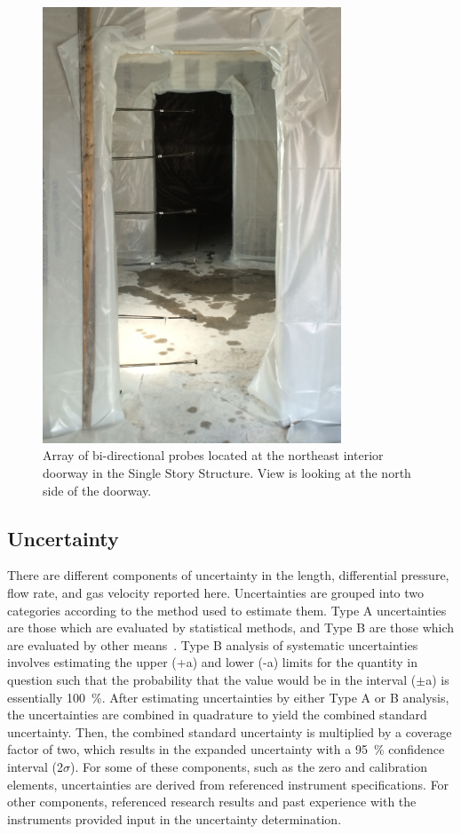 \documentclass[12pt,oneside]{book}
\begin{document}
\begin{figure}[!ht]
	\includegraphics[width=3.5in]{../Figures/Pictures/BDPs_east}
	\caption[Array of bi-directional probes at interior doorway in Single Story Structure.]{Array of bi-directional probes located at the northeast interior doorway in the Single Story Structure. View is looking at the north side of the doorway.}
	\label{fig:BDPs}
\end{figure}
\FloatBarrier

\subsection{Uncertainty}
\label{sec:uncertainty}
There are different components of uncertainty in the length, differential pressure, flow rate, and gas velocity reported here. Uncertainties are grouped into two categories according to the method used to estimate them. Type A uncertainties are those which are evaluated by statistical methods, and Type B are those which are evaluated by other means~\cite{Taylor&Kuyatt:1994}. Type B analysis of systematic uncertainties involves estimating the upper (+a) and lower (-a) limits for the quantity in question such that the probability that the value would be in the interval ($\pm$a) is essentially 100~\%. After estimating uncertainties by either Type A or B analysis, the uncertainties are combined in quadrature to yield the combined standard uncertainty. Then, the combined standard uncertainty is multiplied by a coverage factor of two, which results in the expanded uncertainty with a 95~\% confidence interval (2$\sigma$). For some of these components, such as the zero and calibration elements, uncertainties are derived from referenced instrument specifications. For other components, referenced research results and past experience with the instruments provided input in the uncertainty determination. 
\end{document}
